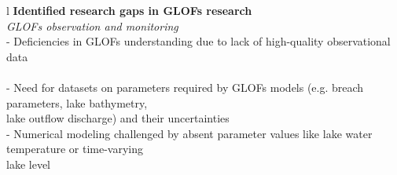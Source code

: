\begin{table}[h]
\centering
\caption{Summary of the research gaps on GLOFs identified in this Introduction and proposed ways forward assessed in this thesis.}
\begin{tabular}{l}
\hline
\textbf{Identified research gaps in GLOFs research}  \\
\hline
\textit{GLOFs observation and monitoring} \\
\hline
- Deficiencies in GLOFs understanding due to lack of high-quality observational data\\ {\citep{Roberts2005,Huss&al2007}} \\
- Need for datasets on parameters required by GLOFs models (e.g. breach parameters, lake bathymetry,\\ lake outflow discharge) and their uncertainties {\citep{Emmer&al2022,Zhang&al2024}} \\
- Numerical modeling challenged by absent parameter values like lake water temperature or time-varying\\ lake level {\citep{Carrivick&al2020,Zhang&al2024}} \\



\end{tabular}
\end{table}
